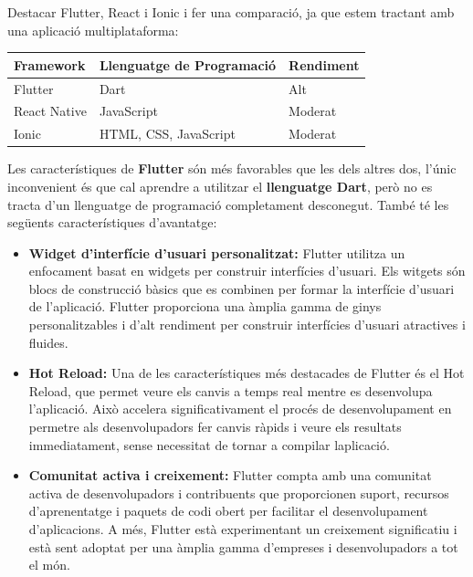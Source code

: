 \documentclass[a4paper,12pt,twoside]{ThesisStyle}
\begin{document}
Destacar Flutter, React i Ionic i fer una comparació, ja que estem tractant amb una aplicació multiplataforma:

    \begin{table}[htbp]
    \centering
    \begin{tabular}{|l|l|l|}
    \hline
    \textbf{Framework} & \textbf{Llenguatge de Programació} & \textbf{Rendiment}                         \\ \hline
    Flutter            & Dart                                                       & Alt                  \\ \hline
    React Native       & JavaScript                                                  & Moderat               \\ \hline
    Ionic              & HTML, CSS, JavaScript                                       & Moderat               \\ \hline
    \end{tabular}
    \end{table}

Les característiques de \textbf{Flutter} són més favorables que les dels altres dos, l'únic inconvenient és que cal aprendre a utilitzar el \textbf{llenguatge Dart}, però no es tracta d'un llenguatge de programació completament desconegut. També té les següents característiques d'avantatge:
\begin{itemize}
    \item\textbf{Widget d'interfície d'usuari personalitzat:} Flutter utilitza un enfocament basat en widgets per construir interfícies d'usuari. Els witgets són blocs de construcció bàsics que es combinen per formar la interfície d'usuari de l'aplicació. Flutter proporciona una àmplia gamma de ginys personalitzables i d'alt rendiment per construir interfícies d'usuari atractives i fluides.
    \item\textbf{Hot Reload:} Una de les característiques més destacades de Flutter és el Hot Reload, que permet veure els canvis a temps real mentre es desenvolupa l'aplicació. Això accelera significativament el procés de desenvolupament en permetre als desenvolupadors fer canvis ràpids i veure els resultats immediatament, sense necessitat de tornar a compilar laplicació.
    \item\textbf{Comunitat activa i creixement:} Flutter compta amb una comunitat activa de desenvolupadors i contribuents que proporcionen suport, recursos d'aprenentatge i paquets de codi obert per facilitar el desenvolupament d'aplicacions. A més, Flutter està experimentant un creixement significatiu i està sent adoptat per una àmplia gamma d'empreses i desenvolupadors a tot el món.
\end{itemize}
\end{document}
